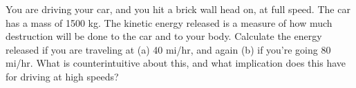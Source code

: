 \answercheck You are driving your car, and you hit a brick wall head
on, at full speed. The car has a mass of 1500 kg. The
kinetic energy released is a measure of how much destruction
will be done to the car and to your body. Calculate the
energy released if you are traveling at (a) 40 mi/hr, and
again (b) if you're going 80 mi/hr. What is counterintuitive
about this, and what implication does this have for
driving at high speeds?
